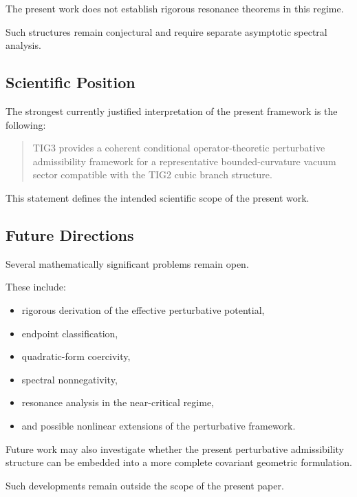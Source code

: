 The present work does not establish rigorous resonance theorems in this regime.

Such structures remain conjectural and require separate asymptotic spectral analysis.


\subsection{Scientific Position}

The strongest currently justified interpretation of the present framework is the following:

\begin{quote}
TIG3 provides a coherent conditional operator-theoretic perturbative admissibility framework for a representative bounded-curvature vacuum sector compatible with the TIG2 cubic branch structure.
\end{quote}

This statement defines the intended scientific scope of the present work.


\subsection{Future Directions}

Several mathematically significant problems remain open.

These include:
\begin{itemize}[leftmargin=0.6cm]
\item rigorous derivation of the effective perturbative potential,
\item endpoint classification,
\item quadratic-form coercivity,
\item spectral nonnegativity,
\item resonance analysis in the near-critical regime,
\item and possible nonlinear extensions of the perturbative framework.
\end{itemize}

Future work may also investigate whether the present perturbative admissibility structure can be embedded into a more complete covariant geometric formulation.

Such developments remain outside the scope of the present paper.

